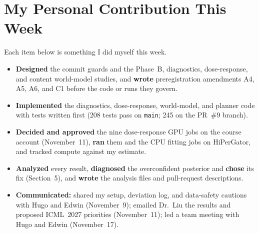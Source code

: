\documentclass[11pt,letterpaper]{article}
\begin{document}
\section{My Personal Contribution This Week}
Each item below is something I did myself this week.
\begin{itemize}
  \item \textbf{Designed} the commit guards and the Phase~B, diagnostics, dose-response, and content world-model studies, and \textbf{wrote} preregistration amendments A4, A5, A6, and C1 before the code or runs they govern.
  \item \textbf{Implemented} the diagnostics, dose-response, world-model, and planner code with tests written first (208 tests pass on \texttt{main}; 245 on the PR~\#9 branch).
  \item \textbf{Decided and approved} the nine dose-response GPU jobs on the course account (November~11), \textbf{ran} them and the CPU fitting jobs on HiPerGator, and tracked compute against my estimate.
  \item \textbf{Analyzed} every result, \textbf{diagnosed} the overconfident posterior and \textbf{chose} its fix (Section~5), and \textbf{wrote} the analysis files and pull-request descriptions.
  \item \textbf{Communicated:} shared my setup, deviation log, and data-safety cautions with Hugo and Edwin (November~9); emailed Dr.~Liu the results and proposed ICML~2027 priorities (November~11); led a team meeting with Hugo and Edwin (November~17).
\end{itemize}
\end{document}
